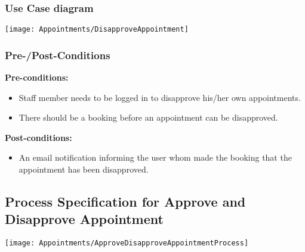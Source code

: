 \subsubsection{Use Case diagram}
\texttt{[image: Appointments/DisapproveAppointment]}

\subsubsection{Pre-/Post-Conditions}
\textbf{Pre-conditions:} 
	\begin{itemize}
		\item Staff member needs to be logged in to disapprove his/her own appointments.
		\item There should be a booking before an appointment can be disapproved.
	\end{itemize}
\textbf{ Post-conditions:} 
	\begin{itemize}
		\item An email notification informing the user whom made the booking that the appointment has been disapproved.
	\end{itemize}	

\subsection{Process Specification for Approve and Disapprove Appointment}
	\texttt{[image: Appointments/ApproveDisapproveAppointmentProcess]}	